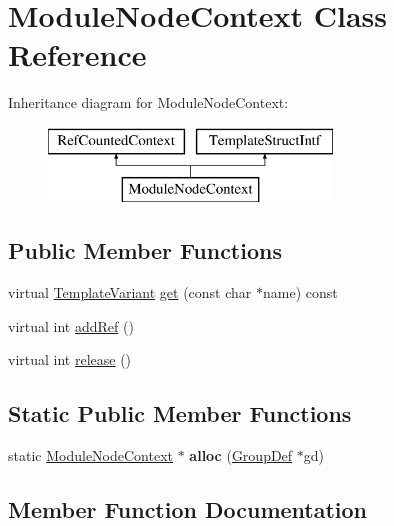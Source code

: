 \hypertarget{class_module_node_context}{}\section{Module\+Node\+Context Class Reference}
\label{class_module_node_context}
Inheritance diagram for Module\+Node\+Context\+:\begin{figure}[H]
\begin{center}
\leavevmode
\includegraphics[height=2.000000cm]{class_module_node_context}
\end{center}
\end{figure}
\subsection*{Public Member Functions}
\begin{DoxyCompactItemize}
\item 
virtual \mbox{\hyperlink{class_template_variant}{Template\+Variant}} \mbox{\hyperlink{class_module_node_context_a5257de331aa6d0e74d209d61a2fc29f2}{get}} (const char $\ast$name) const
\item 
virtual int \mbox{\hyperlink{class_module_node_context_a284f34df0eaa975c777de7ccba4a80eb}{add\+Ref}} ()
\item 
virtual int \mbox{\hyperlink{class_module_node_context_adbd3a06adc44c46a8124fc61634dd0c5}{release}} ()
\end{DoxyCompactItemize}
\subsection*{Static Public Member Functions}
\begin{DoxyCompactItemize}
\item 
\mbox{\label{class_module_node_context_a134aa51eb6f16c13a0b1c3e0a2691cc9}} 
static \mbox{\hyperlink{class_module_node_context}{Module\+Node\+Context}} $\ast$ {\bfseries alloc} (\mbox{\hyperlink{class_group_def}{Group\+Def}} $\ast$gd)
\end{DoxyCompactItemize}


\subsection{Member Function Documentation}
\mbox{\label{class_module_node_context_a284f34df0eaa975c777de7ccba4a80eb}} 
